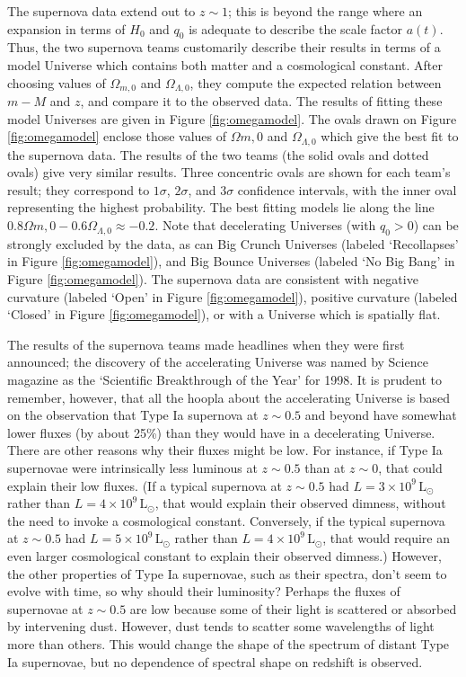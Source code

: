 \documentclass[a4paper,11pt]{article}
\begin{document}
{\noindent}The supernova data extend out to $z\sim1$; this is beyond the range where an expansion in terms of $H_0$ and $q_0$ is adequate to describe the scale factor $a(t)$. Thus, the two supernova teams customarily describe their results in terms of a model Universe which contains both matter and a cosmological constant. After choosing values of $\Omega_{m,0}$ and $\Omega_{\Lambda,0}$, they compute the expected relation between $m-M$ and $z$, and compare it to the observed data. The results of fitting these model Universes are given in Figure \ref{fig:omegamodel}. The ovals drawn on Figure \ref{fig:omegamodel} enclose those values of $\Omega{m,0}$ and $\Omega_{\Lambda,0}$ which give the best fit to the supernova data. The results of the two teams (the solid ovals and dotted ovals) give very similar results. Three concentric ovals are shown for each team’s result; they correspond to $1\sigma$, $2\sigma$, and $3\sigma$ confidence intervals, with the inner oval representing the highest probability. The best fitting models lie along the line $0.8\Omega{m,0}-0.6\Omega_{\Lambda,0}\approx-0.2.$ Note that decelerating Universes (with $q_0>0$) can be strongly excluded by the data, as can Big Crunch Universes (labeled `Recollapses' in Figure \ref{fig:omegamodel}), and Big Bounce Universes (labeled `No Big Bang' in Figure \ref{fig:omegamodel}). The supernova data are consistent with negative curvature (labeled `Open' in Figure \ref{fig:omegamodel}), positive curvature (labeled `Closed' in Figure \ref{fig:omegamodel}), or with a Universe which is spatially flat.

{\noindent}The results of the supernova teams made headlines when they were first announced; the discovery of the accelerating Universe was named by Science magazine as the `Scientific Breakthrough of the Year' for 1998. It is prudent to remember, however, that all the hoopla about the accelerating Universe is based on the observation that Type Ia supernova at $z\sim0.5$ and beyond have somewhat lower fluxes (by about 25\%) than they would have in a decelerating Universe. There are other reasons why their fluxes might be low. For instance, if Type Ia supernovae were intrinsically less luminous at $z\sim0.5$ than at $z\sim0$, that could explain their low fluxes. (If a typical supernova at $z\sim0.5$ had $L=3\times10^9\,\mathrm{L}_\odot$ rather than $L=4\times10^9\,\mathrm{L}_\odot$, that would explain their observed dimness, without the need to invoke a cosmological constant. Conversely, if the typical supernova at $z\sim0.5$ had $L=5\times10^9\,\mathrm{L}_\odot$ rather than $L=4\times10^9\,\mathrm{L}_\odot$, that would require an even larger cosmological constant to explain their observed dimness.) However, the other properties of Type Ia supernovae, such as their spectra, don’t seem to evolve with time, so why should their luminosity? Perhaps the fluxes of supernovae at $z\sim0.5$ are low because some of their light is scattered or absorbed by intervening dust. However, dust tends to scatter some wavelengths of light more than others. This would change the shape of the spectrum of distant Type Ia supernovae, but no dependence of spectral shape on redshift is observed.
\end{document}
